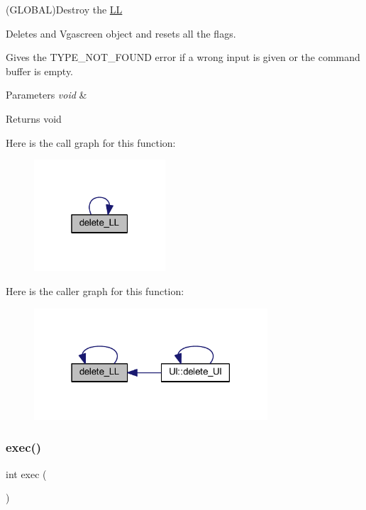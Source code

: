 (G\+L\+O\+B\+AL)Destroy the \mbox{\hyperlink{namespace_l_l}{LL}} 

Deletes and Vgascreen object and resets all the flags.

Gives the T\+Y\+P\+E\+\_\+\+N\+O\+T\+\_\+\+F\+O\+U\+ND error if a wrong input is given or the command buffer is empty.


\begin{DoxyParams}{Parameters}
{\em void} & \\
\hline
\end{DoxyParams}
\begin{DoxyReturn}{Returns}
void 
\end{DoxyReturn}
Here is the call graph for this function\+:\nopagebreak
\begin{figure}[H]
\begin{center}
\leavevmode
\includegraphics[width=139pt]{namespace_l_l_a78899c6737310be03f8a2f05f9d7e09e_cgraph}
\end{center}
\end{figure}
Here is the caller graph for this function\+:\nopagebreak
\begin{figure}[H]
\begin{center}
\leavevmode
\includegraphics[width=247pt]{namespace_l_l_a78899c6737310be03f8a2f05f9d7e09e_icgraph}
\end{center}
\end{figure}
\mbox{\label{namespace_l_l_ac98bc19f4e3468b76cfc2e43456527cc}} 
\subsubsection{\texorpdfstring{exec()}{exec()}}
{\footnotesize\ttfamily int exec (\begin{DoxyParamCaption}\item[{void}]{ }\end{DoxyParamCaption})}



